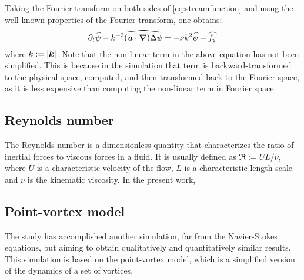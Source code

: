 \documentclass[../main.tex]{subfiles}
\begin{document}
Taking the Fourier transform on both sides of \cref{eq:streamfunction} and using the well-known properties of the Fourier transform, one obtains:
\begin{equation}\label{eq:streamfunction_fourier}
	\partial_t \widehat{\psi} - k^{-2} \widehat{(\boldsymbol{u}\cdot \grad) \Delta \psi}= -\nu k^2 \widehat{\psi} + \widehat{f_\psi}
\end{equation}
where $k:=\abs{\boldsymbol{k}}$. Note that the non-linear term in the above equation has not been simplified. This is because in the simulation that term is backward-transformed to the physical space, computed, and then transformed back to the Fourier space, as it is less expensive than computing the non-linear term in Fourier space.

\subsection{Reynolds number}
The Reynolds number is a dimensionless quantity that characterizes the ratio of inertial forces to viscous forces in a fluid. It is usually defined as $\Re:= UL/\nu$, where $U$ is a characteristic velocity of the flow, $L$ is a characteristic length-scale and $\nu$ is the kinematic viscosity. In the present work,

\subsection{Point-vortex model}
The study has accomplished another simulation, far from the Navier-Stokes equations, but aiming to obtain qualitatively and quantitatively similar results. This simulation is based on the point-vortex model, which is a simplified version of the dynamics of a set of vortices.
\end{document}
